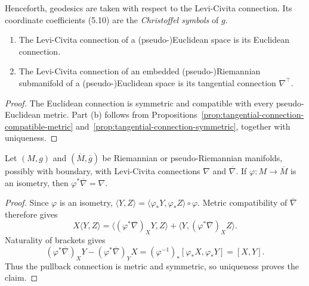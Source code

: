 Henceforth, geodesics are taken with respect to the Levi-Civita connection.
Its coordinate coefficients (5.10) are the \emph{Christoffel symbols} of $g$.

\begin{proposition}
\label{prop:levi-civita-on-euclidean-and-submanifolds}

\begin{enumerate}
\item[(a)] The Levi-Civita connection of a (pseudo-)Euclidean space is its
Euclidean connection.
\item[(b)] The Levi-Civita connection of an embedded (pseudo-)Riemannian
submanifold of a (pseudo-)Euclidean space is its tangential connection
$\nabla^\top$.
\end{enumerate}

\begin{proof}
\sketch The Euclidean connection is symmetric and compatible with every
pseudo-Euclidean metric. Part (b) follows from
Propositions~\ref{prop:tangential-connection-compatible-metric}
and~\ref{prop:tangential-connection-symmetric}, together with uniqueness.
\end{proof}
\end{proposition}

\begin{proposition}
\label{prop:naturality-levi-civita}

Let $(M,g)$ and $(\overline M,\overline g)$ be Riemannian or
pseudo-Riemannian manifolds, possibly with boundary, with Levi-Civita
connections $\nabla$ and $\overline\nabla$. If
$\varphi:M\to\overline M$ is an isometry, then
$\varphi^*\overline\nabla=\nabla$.

\begin{proof}
\sketch Since $\varphi$ is an isometry,
$\langle Y,Z\rangle=\langle\varphi_*Y,\varphi_*Z\rangle\circ\varphi$.
Metric compatibility of $\overline\nabla$ therefore gives
\[
X\langle Y,Z\rangle
=\langle(\varphi^*\overline\nabla)_XY,Z\rangle
+\langle Y,(\varphi^*\overline\nabla)_XZ\rangle.
\]
Naturality of brackets gives
\[
(\varphi^*\overline\nabla)_XY-(\varphi^*\overline\nabla)_YX
=(\varphi^{-1})_*[\varphi_*X,\varphi_*Y]=[X,Y].
\]
Thus the pullback connection is metric and symmetric, so uniqueness proves the
claim.
\end{proof}
\end{proposition}

